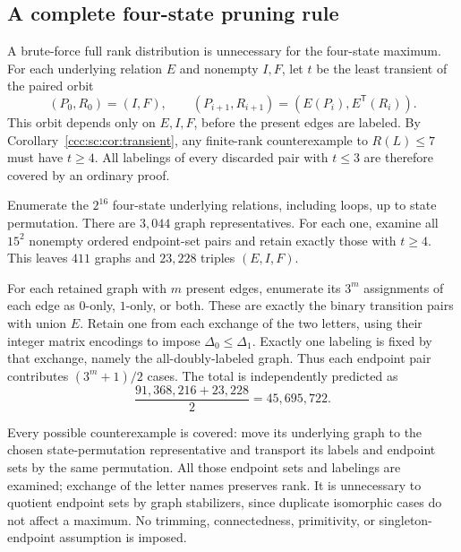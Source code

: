 \documentclass[11pt,letterpaper]{article}
\theoremstyle{definition}
\theoremstyle{remark}
\begin{document}
\subsection{A complete four-state pruning rule}

A brute-force full rank distribution is unnecessary for the four-state maximum. For each underlying relation $E$ and nonempty $I,F$, let $t$ be the least transient of the paired orbit
\[
 (P_0,R_0)=(I,F),\qquad
 (P_{i+1},R_{i+1})=(E(P_i),E^{\mathsf T}(R_i)).
\]
This orbit depends only on $E,I,F$, before the present edges are labeled. By Corollary~\ref{ccc:sc:cor:transient}, any finite-rank counterexample to $R(L)\le7$ must have $t\ge4$. All labelings of every discarded pair with $t\le3$ are therefore covered by an ordinary proof.

Enumerate the $2^{16}$ four-state underlying relations, including loops, up to state permutation. There are $3{,}044$ graph representatives. For each one, examine all $15^2$ nonempty ordered endpoint-set pairs and retain exactly those with $t\ge4$. This leaves $411$ graphs and $23{,}228$ triples $(E,I,F)$.

For each retained graph with $m$ present edges, enumerate its $3^m$ assignments of each edge as $0$-only, $1$-only, or both. These are exactly the binary transition pairs with union $E$. Retain one from each exchange of the two letters, using their integer matrix encodings to impose $\Delta_0\le\Delta_1$. Exactly one labeling is fixed by that exchange, namely the all-doubly-labeled graph. Thus each endpoint pair contributes $(3^m+1)/2$ cases. The total is independently predicted as
\[
 \frac{91{,}368{,}216+23{,}228}{2}=45{,}695{,}722.
\]

Every possible counterexample is covered: move its underlying graph to the chosen state-permutation representative and transport its labels and endpoint sets by the same permutation. All those endpoint sets and labelings are examined; exchange of the letter names preserves rank. It is unnecessary to quotient endpoint sets by graph stabilizers, since duplicate isomorphic cases do not affect a maximum. No trimming, connectedness, primitivity, or singleton-endpoint assumption is imposed.
\end{document}

